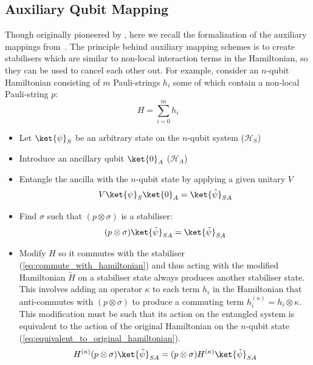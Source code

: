 \subsection{Auxiliary Qubit Mapping}
\label{section:auxillaryMappings}
Though originally pioneered by \cite{Verstraete_2005}, here we recall the formalization of the auxiliary mappings from~\cite{steudtner2019quantum}. The principle behind auxiliary mapping schemes is to create stabilisers which are similar to non-local interaction terms in the Hamiltonian, so they can be used to cancel each other out. For example, consider an $n$-qubit Hamiltonian consisting of $m$ Pauli-strings $h_i$ some of which contain a non-local Pauli-string $p$:
\begin{equation}
    H = \sum_{i=0}^m h_i
\end{equation}
\begin{itemize}
\item Let $\ket{\psi}_S$ be an arbitrary state on the $n$-qubit system ($\mathcal{H}_S$)
\item Introduce an ancillary qubit $\ket{0}_A$ ($\mathcal{H}_A$)
\item Entangle the ancilla with the $n$-qubit state by applying a given unitary $V$
\begin{equation}
    V \ket{\psi}_S \ket{0}_A = \ket{\tilde \psi}_{SA}
\end{equation}
\item Find $\sigma$ such that $(p \otimes \sigma)$ is a stabiliser:
\begin{equation}
    (p \otimes \sigma) \ket{\tilde \psi}_{SA} = \ket{\tilde \psi}_{SA}
\end{equation}
\item Modify $H$ so it commutes with the stabiliser (\ref{eq:commute_with_hamiltonian}) and thus acting with the modified Hamiltonian $\tilde H$ on a stabiliser state always produces another stabiliser state. This involves adding an operator $\kappa$ to each term $h_i$ in the Hamiltonian that anti-commutes with $(p \otimes \sigma)$ to produce a commuting term $h_i^{(\kappa)} = h_i \otimes \kappa$. This modification must be such that its action on the entangled system is equivalent to the action of the original Hamiltonian on the $n$-qubit state (\ref{eq:equivalent_to_original_hamiltonian}).
\begin{equation}
\label{eq:commute_with_hamiltonian}
    H^{(\kappa)}(p \otimes \sigma)  \ket{\tilde \psi}_{SA} =(p \otimes \sigma)  H^{(\kappa)}\ket{\tilde \psi}_{SA}  
\end{equation}

\end{itemize}
